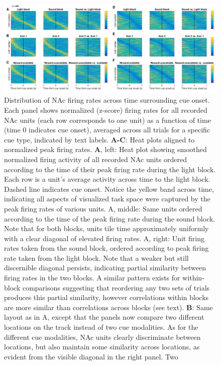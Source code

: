 \documentclass[11pt]{article}
\newcommand{\bsf}[1]{\textbf{#1}}
\providecommand{\DIFaddbeginFL}{} %
\providecommand{\DIFaddendFL}{} %
\providecommand{\DIFdelbeginFL}{} %
\providecommand{\DIFdelendFL}{} %
\newcommand{\DIFscaledelfig}{0.5}
\newlength{\DIFdelgraphicswidth} %
\newlength{\DIFdelgraphicsheight} %
\newcommand{\DIFaddincludegraphics}[2][]{{\color{blue}\fbox{\DIFOincludegraphics[#1]{#2}}}} %
\newcommand{\DIFdelincludegraphics}[2][]{%
\sbox{\DIFdelgraphicsbox}{\DIFOincludegraphics[#1]{#2}}%
\settoboxwidth{\DIFdelgraphicswidth}{\DIFdelgraphicsbox} %
\settoboxtotalheight{\DIFdelgraphicsheight}{\DIFdelgraphicsbox} %
\scalebox{\DIFscaledelfig}{%
\parbox[b]{\DIFdelgraphicswidth}{\usebox{\DIFdelgraphicsbox}\\[-\baselineskip] \rule{\DIFdelgraphicswidth}{0em}}\llap{\resizebox{\DIFdelgraphicswidth}{\DIFdelgraphicsheight}{%
\setlength{\unitlength}{\DIFdelgraphicswidth}%
\begin{picture}(1,1)%
\thicklines\linethickness{2pt} %
{\color[rgb]{1,0,0}\put(0,0){\framebox(1,1){}}}%
{\color[rgb]{1,0,0}\put(0,0){\line( 1,1){1}}}%
{\color[rgb]{1,0,0}\put(0,1){\line(1,-1){1}}}%
\end{picture}%
}\hspace*{3pt}}} %
} %
\DeclareRobustCommand{\DIFaddbeginFL}{\DIFOaddbeginFL \let\includegraphics\DIFaddincludegraphics} %
\DeclareRobustCommand{\DIFaddendFL}{\DIFOaddendFL \let\includegraphics\DIFOincludegraphics} %
\DeclareRobustCommand{\DIFdelbeginFL}{\DIFOdelbeginFL \let\includegraphics\DIFdelincludegraphics} %
\DeclareRobustCommand{\DIFdelendFL}{\DIFOaddendFL \let\includegraphics\DIFOincludegraphics} %
\begin{document}
 \begin{figure}[ht!]
\centering
\DIFdelbeginFL %
\DIFdelendFL \DIFaddbeginFL \includegraphics[width=\textwidth]{Fig 7 - Task tiling.pdf}
\DIFaddendFL \caption{Distribution of NAc firing rates across time surrounding cue
onset. Each panel shows normalized (z-score) firing rates for all recorded NAc
units (each row corresponds to one unit) as a function of time (time 0
indicates cue onset), averaged across all trials for a specific cue type,
indicated by text labels. \bsf{A-C}: Heat plots aligned to normalized peak
firing rates. \bsf{A}, left: Heat plot showing smoothed normalized firing
activity of all recorded NAc units ordered according to the time of their peak
firing rate during the light block. Each row is a unit’s average activity
across time to the light block. Dashed line indicates cue onset. Notice the
yellow band across time, indicating all aspects of visualized task space were
captured by the peak firing rates of various units. A, middle: Same units
ordered according to the time of the peak firing rate during the sound
block. Note that for both blocks, units tile time approximately uniformly with
a clear diagonal of elevated firing rates. A, right: Unit firing rates
taken from the sound block, ordered according to peak firing rate taken from
the light block. Note that a weaker but still discernible diagonal persists,
indicating partial similarity between firing rates in the two blocks. A similar pattern exists for within-block comparisons suggesting that reordering any two sets of trials
produces this partial similarity, however correlations within blocks are more
similar than correlations across blocks (see text). \bsf{B}: Same layout as in
A, except that the panels now compare two different locations on the track
instead of two cue modalities. As for the different cue modalities, NAc units
clearly discriminate between locations, but also maintain some similarity
across locations, as evident from the visible diagonal in the right panel. Two
}
\end{figure}
\end{document}
